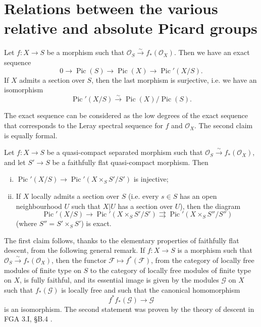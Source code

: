 \section{Relations between the various relative and absolute Picard groups}\label{fga3.v-2}

\begin{proposition}\label{fga3.v-2-proposition-2.1}
    Let $f\colon X\to S$ be a morphism such that $\mathcal{O}_S\xrightarrow{\sim} f_*(\mathcal{O}_X)$.
    Then we have an exact sequence
    \[
        0
        \to \operatorname{Pic}(S)
        \to \operatorname{Pic}(X)
        \to \operatorname{Pic}'(X/S).
    \]
    If $X$ admits a section over $S$, then the last morphism is surjective, i.e. we have an isomorphism
    \[
        \operatorname{Pic}'(X/S)
        \xrightarrow{\sim} \operatorname{Pic}(X)/\operatorname{Pic}(S).
    \]
\end{proposition}


\begin{cproof}
    The exact sequence can be considered as the low degrees of the exact sequence that corresponds to the Leray spectral sequence for $f$ and $\mathcal{O}_X$.
    The second claim is equally formal.
\end{cproof}

\begin{proposition}\label{fga3.v-2-proposition-2.2}
    Let $f\colon X\to S$ be a quasi-compact separated morphism such that $\mathcal{O}_S\xrightarrow{\sim} f_*(\mathcal{O}_X)$, and let $S'\to S$ be a faithfully flat quasi-compact morphism.
    Then
    \begin{enumerate}[i.]
        \item $\operatorname{Pic}'(X/S)\to\operatorname{Pic}'(X\times_S S'/S')$ is injective;
        \item If $X$ locally admits a section over $S$ (i.e. every $s\in S$ has an open neighbourhood $U$ such that $X|U$ has a section over $U$), then the diagram
              \[
                  \operatorname{Pic}'(X/S)
                  \to \operatorname{Pic}'(X\times_S S'/S')
                  \rightrightarrows \operatorname{Pic}'(X\times_S S''/S'')
              \]
              (where $S''=S'\times_S S'$) is exact.
    \end{enumerate}
\end{proposition}

\begin{cproof}
    The first claim follows, thanks to the elementary properties of faithfully flat descent, from the following general remark.
    If $f\colon X\to S$ is a morphism such that $\mathcal{O}_S\xrightarrow{\sim} f_*(\mathcal{O}_X)$, then the functor $\mathcal{F}\mapsto f^*(\mathcal{F})$, from the category of locally free modules of finite type on $S$ to the category of locally free modules of finite type on $X$, is fully faithful, and its essential image is given by the modules $\mathcal{G}$ on $X$ such that $f_*(\mathcal{G})$ is locally free and such that the canonical homomorphism
    \[
        f^*f_*(\mathcal{G}) \to \mathcal{G}
    \]
    is an isomorphism.
    The second statement was proven by the theory of descent in FGA 3.I, §B.4 .
\end{cproof}


